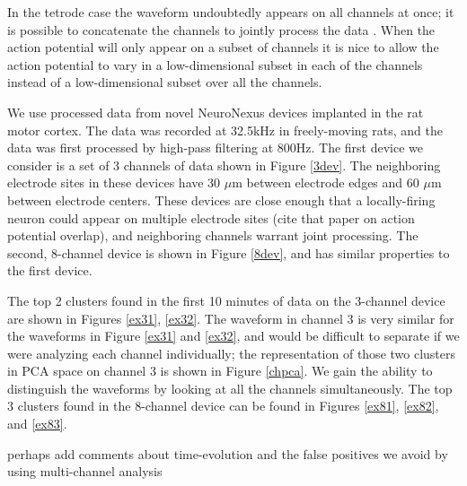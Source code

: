 In the tetrode case the waveform undoubtedly appears on all channels at once; it is possible to concatenate the channels to jointly process the data \cite{wood2009}.  When the action potential will only appear on a subset of channels it is nice to allow the action potential to vary in a low-dimensional subset in each of the channels instead of a low-dimensional subset over all the channels. \cite{Prentice2011}

We use processed data from novel NeuroNexus devices implanted in the rat motor cortex.  The data was recorded at 32.5kHz in freely-moving rats, and the data was first processed by high-pass filtering at 800Hz.  The first device we consider is a set of 3 channels of data shown in Figure \ref{3dev}.  The neighboring electrode sites in these devices have 30 $\mu$m between electrode edges and 60 $\mu$m between electrode centers.  These devices are close enough that a locally-firing neuron could appear on multiple electrode sites (cite that paper on action potential overlap), and neighboring channels warrant joint processing.  The second, 8-channel device is shown in Figure \ref{8dev}, and has similar properties to the first device.

 The top 2 clusters found in the first 10 minutes of data on the 3-channel device are shown in Figures \ref{ex31}, \ref{ex32}.  The waveform in channel 3 is very similar for the waveforms in Figure \ref{ex31} and \ref{ex32}, and would be difficult to separate if we were analyzing each channel individually; the representation of those two clusters in PCA space on channel 3 is shown in Figure \ref{chpca}.  We gain the ability to distinguish the waveforms by looking at all the channels simultaneously.  The top 3 clusters found in the 8-channel device can be found in Figures \ref{ex81}, \ref{ex82}, and \ref{ex83}.

{\color{red} perhaps add comments about time-evolution and the false positives we avoid by using multi-channel analysis}


